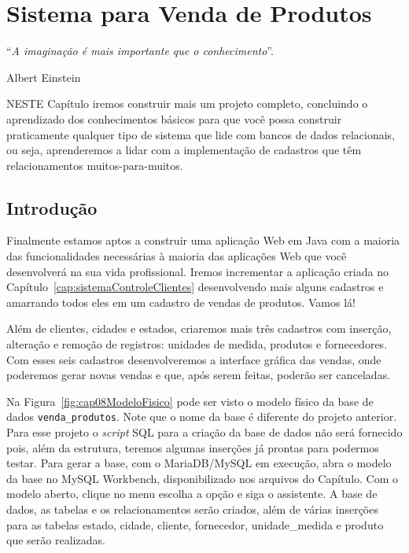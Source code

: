 \chapter{Sistema para Venda de Produtos}\label{cap:sistemaVendaProdutos}
\epigraph{``\textit{A imaginação é mais importante que o conhecimento}''.}{Albert Einstein}

\lettrine[lines=4, lhang=0.1, lraise=0, loversize=0.2, findent=0.1em]{\textcolor{corTema}{N}}{ESTE} Capítulo iremos construir mais um projeto completo, concluindo o aprendizado dos conhecimentos básicos para que você possa construir praticamente qualquer tipo de sistema que lide com bancos de dados relacionais, ou seja, aprenderemos a lidar com a implementação de cadastros que têm relacionamentos muitos-para-muitos.


\section{Introdução}

Finalmente estamos aptos a construir uma aplicação Web em Java com a maioria das funcionalidades necessárias à maioria das aplicações Web que você desenvolverá na sua vida profissional. Iremos incrementar a aplicação criada no Capítulo~\ref{cap:sistemaControleClientes} desenvolvendo mais alguns cadastros e amarrando todos eles em um cadastro de vendas de produtos. Vamos lá!

Além de clientes, cidades e estados, criaremos mais três cadastros com inserção, alteração e remoção de registros: unidades de medida, produtos e fornecedores. Com esses seis cadastros desenvolveremos a interface gráfica das vendas, onde poderemos gerar novas vendas e que, após serem feitas, poderão ser canceladas.

Na Figura~\ref{fig:cap08ModeloFisico} pode ser visto o modelo físico da base de dados \texttt{venda\_produtos}. Note que o nome da base é diferente do projeto anterior. Para esse projeto o \textit{script} SQL para a criação da base de dados não será fornecido pois, além da estrutura, teremos algumas inserções já prontas para podermos testar. Para gerar a base, com o MariaDB/MySQL em execução, abra o modelo da base no MySQL Workbench, disponibilizado nos arquivos do Capítulo. Com o modelo aberto, clique no menu  escolha a opção  e siga o assistente. A base de dados, as tabelas e os relacionamentos serão criados, além de várias inserções para as tabelas estado, cidade, cliente, fornecedor, unidade\_medida e produto que serão realizadas.

